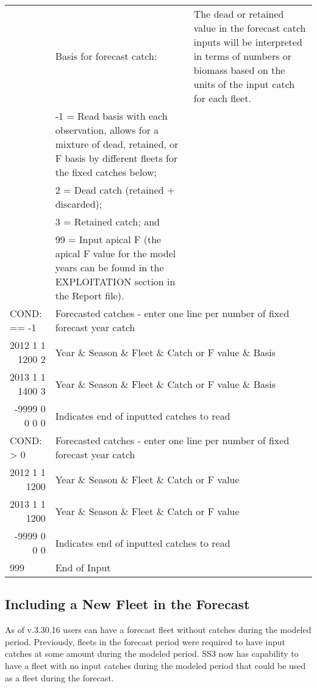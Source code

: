 \begin{landscape}
{\begin{longtable}{p{3.2cm} p{7cm} p{10.8cm}}
  \pagebreak
  -1 & Basis for forecast catch: & \multirow{1}{1cm}[-0.25cm]{\parbox{11cm}{The dead or retained value in the forecast catch inputs will be interpreted in terms of numbers or biomass based on the units of the input catch for each fleet.}} \Tstrut\\
    & -1 = Read basis with each observation, allows for a mixture of dead, retained, or F basis by different fleets for the fixed catches below; & \\
    & 2 = Dead catch (retained + discarded); & \\
    & 3 = Retained catch; and & \\
    & 99 = Input apical F (the apical F value for the model years can be found in the EXPLOITATION section in the Report file). & \Bstrut\\

  \hline
  \multicolumn{1}{l}{COND: == -1} & \multicolumn{2}{l}{Forecasted catches - enter one line per number of fixed forecast year catch} \Tstrut\\
  \multicolumn{1}{r}{2012 1 1 1200 2} & \multicolumn{2}{l}{Year \& Season \& Fleet \& Catch or F value \& Basis} \\
  \multicolumn{1}{r}{2013 1 1 1400 3} & \multicolumn{2}{l}{Year \& Season \& Fleet \& Catch or F value \& Basis} \\
  \multicolumn{1}{r}{-9999 0 0 0 0} & \multicolumn{2}{l}{Indicates end of inputted catches to read} \Bstrut\\

  \multicolumn{1}{l}{COND: > 0} & \multicolumn{2}{l}{Forecasted catches - enter one line per number of fixed forecast year catch} \Tstrut\\
  \multicolumn{1}{r}{2012 1 1 1200} & \multicolumn{2}{l}{Year \& Season \& Fleet \& Catch or F value} \\
  \multicolumn{1}{r}{2013 1 1 1200} & \multicolumn{2}{l}{Year \& Season \& Fleet \& Catch or F value} \\
  \multicolumn{1}{r}{-9999 0 0 0} & \multicolumn{2}{l}{Indicates end of inputted catches to read} \Bstrut\\

  \hline
  999 & End of Input & \Bstrut\\

  \end{longtable}}
\end{landscape}

\subsection{Including a New Fleet in the Forecast}
As of v.3.30.16 users can have a forecast fleet without catches during the modeled period. Previously, fleets in the forecast period were required to have input catches at some amount during the modeled period. SS3 now has capability to have a fleet with no input catches during the modeled period that could be used as a fleet during the forecast.

